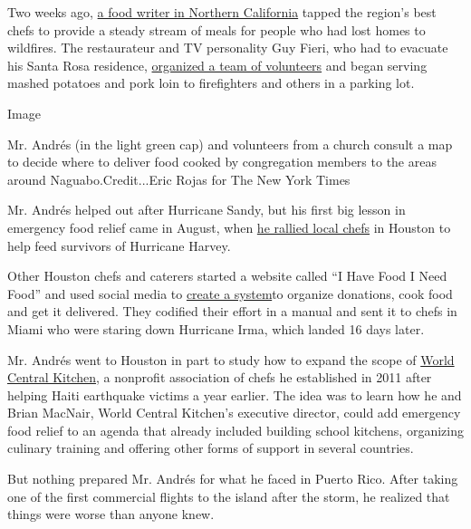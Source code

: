 Two weeks ago,
\href{http://www.pressdemocrat.com/news/7559619-181/sonoma-family-meal-brings-chefs?artslide=0}{a
food writer in Northern California} tapped the region's best chefs to
provide a steady stream of meals for people who had lost homes to
wildfires. The restaurateur and TV personality Guy Fieri, who had to
evacuate his Santa Rosa residence,
\href{https://www.today.com/food/guy-fieri-feeds-california-wildfire-evacuees-first-responders-t117562}{organized
a team of volunteers} and began serving mashed potatoes and pork loin to
firefighters and others in a parking lot.

Image

Mr. Andrés (in the light green cap) and volunteers from a church consult
a map to decide where to deliver food cooked by congregation members to
the areas around Naguabo.Credit...Eric Rojas for The New York Times

Mr. Andrés helped out after Hurricane Sandy, but his first big lesson in
emergency food relief came in August, when
\href{https://www.washingtonpost.com/news/food/wp/2017/08/30/jose-andres-is-on-the-ground-in-houston-ready-to-cook-for-displaced-residents/?utm_term=.0c209646d1a6}{he
rallied local chefs} in Houston to help feed survivors of Hurricane
Harvey.

Other Houston chefs and caterers started a website called ``I Have Food
I Need Food'' and used social media to
\href{http://www.houstonchronicle.com/local/gray-matters/article/How-a-Midtown-shelter-became-a-kitchen-command-12252653.php}{create
a system}to organize donations, cook food and get it delivered. They
codified their effort in a manual and sent it to chefs in Miami who were
staring down Hurricane Irma, which landed 16 days later.

Mr. Andrés went to Houston in part to study how to expand the scope of
\href{https://www.worldcentralkitchen.org/}{World Central Kitchen}, a
nonprofit association of chefs he established in 2011 after helping
Haiti earthquake victims a year earlier. The idea was to learn how he
and Brian MacNair, World Central Kitchen's executive director, could add
emergency food relief to an agenda that already included building school
kitchens, organizing culinary training and offering other forms of
support in several countries.

But nothing prepared Mr. Andrés for what he faced in Puerto Rico. After
taking one of the first commercial flights to the island after the
storm, he realized that things were worse than anyone knew.

